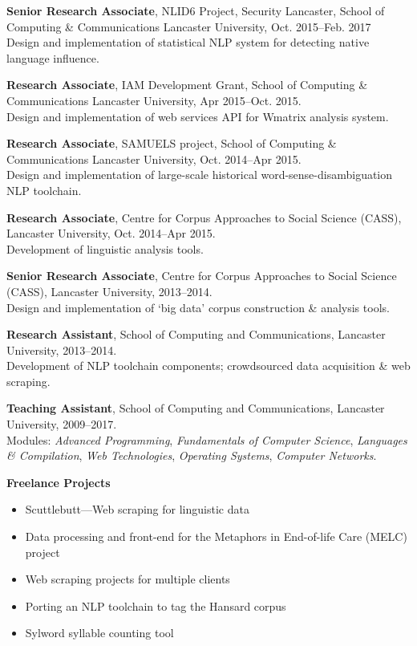 \documentclass{res}
\begin{document}
\begin{resume}
    {\bf Senior Research Associate},
    NLID6 Project, Security Lancaster, School of Computing \& Communications
    Lancaster University,
    Oct. 2015--Feb. 2017\\
    Design and implementation of statistical NLP system for detecting native language influence.

    {\bf Research Associate},
    IAM Development Grant, School of Computing \& Communications
    Lancaster University,
    Apr 2015--Oct. 2015.\\
    Design and implementation of web services API for Wmatrix analysis system.

    {\bf Research Associate},
    SAMUELS project, School of Computing \& Communications
    Lancaster University,
    Oct. 2014--Apr 2015.\\
    Design and implementation of large-scale historical word-sense-disambiguation NLP toolchain.

    {\bf Research Associate},
    Centre for Corpus Approaches to Social Science (CASS),
    Lancaster University,
    Oct. 2014--Apr 2015.\\
    Development of linguistic analysis tools.

    {\bf Senior Research Associate},
    Centre for Corpus Approaches to Social Science (CASS),
    Lancaster University,
    2013--2014.\\
    Design and implementation of `big data' corpus construction \& analysis tools.

    {\bf Research Assistant},
    School of Computing and Communications,
    Lancaster University,
    2013--2014.\\
    Development of NLP toolchain components; crowdsourced data acquisition \& web scraping.

    {\bf Teaching Assistant},
    School of Computing and Communications,
    Lancaster University,
    2009--2017.\\
    Modules: \textsl{Advanced Programming}, \textsl{Fundamentals of Computer Science}, \textsl{Languages \& Compilation}, \textsl{Web Technologies}, \textsl{Operating Systems}, \textsl{Computer Networks}.

    {\bf Freelance Projects}
    \begin{itemize}
        \item Scuttlebutt---Web scraping for linguistic data
        \item Data processing and front-end for the Metaphors in End-of-life Care (MELC) project
        \item Web scraping projects for multiple clients
        \item Porting an NLP toolchain to tag the Hansard corpus
        \item Sylword syllable counting tool
    \end{itemize}


\end{resume}
\end{document}

